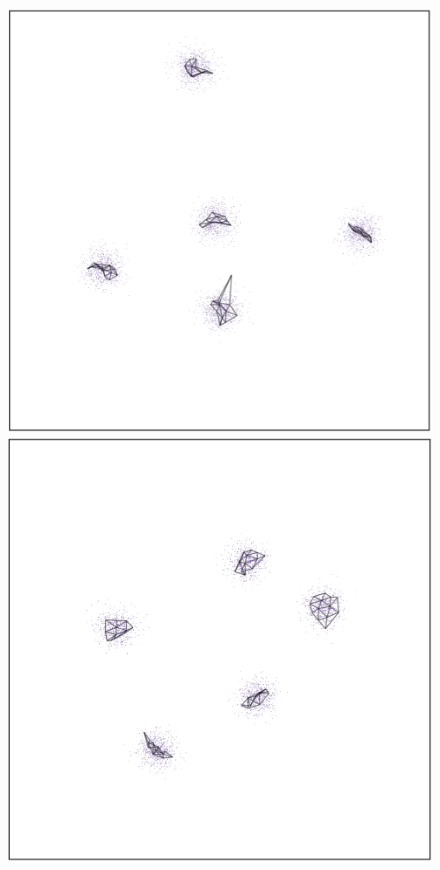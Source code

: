\documentclass[
  12pt]{article}
\begin{document}
\begin{figure}[H]

\begin{minipage}{0.33\linewidth}
\includegraphics{figures/five_gau_clusters/sc_pacmap_1.png}\end{minipage}%
%
\begin{minipage}{0.33\linewidth}
\includegraphics{figures/five_gau_clusters/sc_pacmap_2.png}\end{minipage}%

\end{figure}
\end{document}
